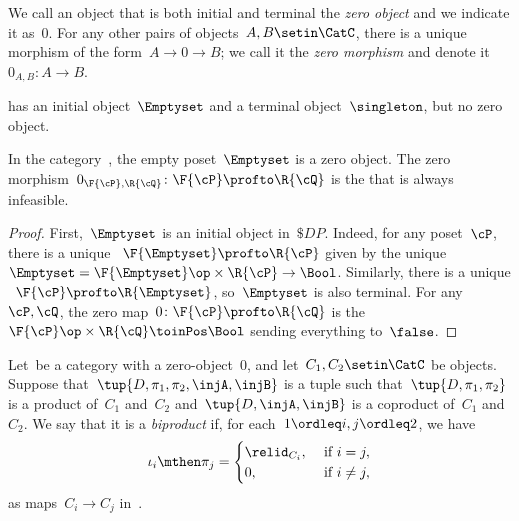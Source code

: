 \begin{ctdefinition}
    \label{def:zero-object}
    We call an object that is both initial and terminal the \emph{zero object} and we indicate it as~$0$.
    For any other pairs of objects~$A, B\setin\CatC$, there is a unique morphism of the form~$A \to 0\to B$; we call it the \emph{zero morphism} and denote it~$0_{A,B}\colon A \to B$.
\end{ctdefinition}

\begin{example}
    \Pos has an initial object~$\Emptyset$ and a terminal object~$\singleton$, but no zero object.
\end{example}

\begin{lemma}
    In the category~\DP, the empty poset~$\Emptyset$ is a zero object.
    The zero morphism~$0_{\F{\cP},\R{\cQ}}\colon \F{\cP} \profto \R{\cQ}$ is the  that is always infeasible.
\end{lemma}
\begin{proof}
    First,~$\Emptyset$ is an initial object in~$\$DP$.
    Indeed, for any poset~$\cP $, there is a unique ~$\F{\Emptyset} \profto \R{\cP}$ given by the unique ~$\Emptyset=\F{\Emptyset}\op\times \R{\cP} \to\Bool$.
    Similarly, there is a unique ~$\F{\cP} \profto \R{\Emptyset}$, so~$\Emptyset$ is also terminal.
    For any ~$\cP,\cQ$, the zero map~$0 \colon \F{\cP} \profto \R{\cQ}$ is the ~$\F{\cP} \op\times \R{\cQ} \toinPos \Bool$ sending everything to~$\false$.
\end{proof}

\begin{ctdefinition}[Biproduct]
    \label{def:biproduct}
    Let~\CatC be a category with a zero-object~$0$, and let~$C_1,C_2\setin\CatC$ be objects.
    Suppose that~$\tup{D,\pi_1,\pi_2,\injA,\injB}$ is a tuple such that~$\tup{D,\pi_1,\pi_2}$ is a product of~$C_1$ and~$C_2$ and~$\tup{D,\injA,\injB}$ is a coproduct of~$C_1$ and~$C_2$.
    We say that it is a \emph{biproduct} if, for each~$1\ordleq i,j\ordleq 2$, we have
    \begin{equation}
        \iota_i\mthen \pi_j=
        \begin{cases}
            \relid_{C_i}, & \text{ if }i=j,     \\
            0,            & \text{ if }i\neq j,
        \end{cases} \label{eq:biproduct-condition}
    \end{equation}
    as maps~$C_i\to C_j$ in~\CatC.
\end{ctdefinition}

